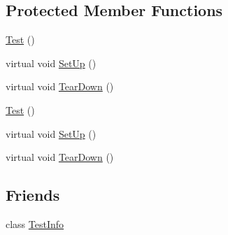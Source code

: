 \subsection*{Protected Member Functions}
\begin{DoxyCompactItemize}
\item 
\hyperlink{classtesting_1_1_test_a99f2bbfac6c95612322b0f10e607ebe5}{Test} ()
\item 
virtual void \hyperlink{classtesting_1_1_test_a190315150c303ddf801313fd1a777733}{Set\-Up} ()
\item 
virtual void \hyperlink{classtesting_1_1_test_a5f0ab439802cbe0ef7552f1a9f791923}{Tear\-Down} ()
\item 
\hyperlink{classtesting_1_1_test_a68b7618abd1fc6d13382738b0d3b5c7c}{Test} ()
\item 
virtual void \hyperlink{classtesting_1_1_test_a8b38992669fb844864807cf32e416853}{Set\-Up} ()
\item 
virtual void \hyperlink{classtesting_1_1_test_aab3c02c9f81afe1357adfc45afccd474}{Tear\-Down} ()
\end{DoxyCompactItemize}
\subsection*{Friends}
\begin{DoxyCompactItemize}
\item 
class \hyperlink{classtesting_1_1_test_aed3c96e2bd5a46339c1cbe49a4a233ee}{Test\-Info}
\end{DoxyCompactItemize}


